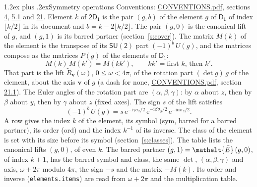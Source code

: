\documentclass[10pt,a4paper]{article}
\makeatletter
\renewcommand\section{\@startsection{section}{1}{\z@}{-3ex plus -1ex minus -.2ex}%
  {1.2ex plus .2ex}{\normalfont\large\sffamily\bfseries\color{parttitle}}}
\numberwithin{equation}{section}
\newcommand{\eltfont}[1]{{\let\sigma\eltsigma\mathelt{#1}}}
\newcommand{\grp}[1]{\mathsf{#1}}
\newcommand{\elt}[1]{\eltfont{#1}}
\newcommand{\vv}{\mathbf{v}}
\newcommand{\iunit}{\mathrm{i}}
\newcommand{\expe}{\mathrm{e}}
\newcommand{\barred}[1]{\bar{#1}}
\newcommand{\lift}[1]{\tilde{#1}}
\newcommand{\pauli}[1]{\sigma_{#1}}
\makeatother
\begin{document}
\section{Symmetry operations}\label{s:elements}
Conventions: \href{../../CONVENTIONS.pdf}{CONVENTIONS.pdf}, sections \href{../../../rotation/CONVENTIONS.pdf\#conv.4}{4}, \href{../../../rotation/CONVENTIONS.pdf\#conv.5.1}{5.1} and \href{../../CONVENTIONS.pdf\#conv.21}{21}.
\leavevmode\label{n:index.element}\label{n:element.g}Element $k$ of $\grp{2D_{1}}$ is the pair $(g, b)$ of the element $g$ of \href{../../../rotation/data/pdf/D1.pdf}{$\grp{D_{1}}$} of index $\lfloor k/2\rfloor$ in its document and $b = k - 2\lfloor k/2\rfloor$. The pair $(g, 0)$ is the canonical lift of $g$, and $(g, 1)$ is its barred partner (section~\ref{s:cover}). \label{n:matrix.element.pin}\label{n:matrix.element}The matrix $M(k)$ of the element is the transpose of its $\grp{SU(2)}$ part $(-1)^{b}\,U(g)$, and the matrices compose as the matrices $P(g)$ of the elements of $\grp{D_{1}}$:
\begin{equation}\label{e:mprod}M(k)\,M(k') = M(kk'),\qquad kk' = \text{first } k\text{, then } k'.\end{equation}
\leavevmode\label{n:angle.omega}\label{n:vector.axis}\label{n:vector.pole}That part is the lift $\lift{R}_{\vv}(\omega)$, $0 \le \omega < 4\pi$, of the rotation part $(\det g)\,g$ of the element, about the axis $\vv$ of $g$ (a dash for none, \href{../../CONVENTIONS.pdf}{CONVENTIONS.pdf}, section \href{../../CONVENTIONS.pdf\#conv.21.1}{21.1}). \label{n:angle.euler.alpha}\label{n:angle.euler.beta}\label{n:angle.euler.gamma}\label{n:vector.coordinates}The Euler angles of the rotation part are $(\alpha,\beta,\gamma)$: by $\alpha$ about $z$, then by $\beta$ about $y$, then by $\gamma$ about $z$ (fixed axes). \label{n:local.euler.sign}The sign $s$ of the lift satisfies
\begin{equation}\label{e:euler}(-1)^{b}\,U(g) = s\,\expe^{-\iunit\gamma\pauli{z}/2}\,\expe^{-\iunit\beta\pauli{y}/2}\,\expe^{-\iunit\alpha\pauli{z}/2}.\end{equation}
\leavevmode\label{n:index.element.inverse}\label{n:head.sym}\label{n:head.ord}A row gives the index $k$ of the element, its symbol (sym, barred for a barred partner), its order (ord) and the index $k^{-1}$ of its inverse. \label{n:head.class}The class of the element is set with its size before its symbol (section~\ref{s:classes}).
The table lists the canonical lifts $(g, 0)$, of even $k$. The barred partner $(g, 1) = \elt{\barred{E}}\,(g, 0)$, of index $k + 1$, has the barred symbol and class, the same $\det$, $(\alpha,\beta,\gamma)$ and axis, $\omega + 2\pi$ modulo $4\pi$, the sign $-s$ and the matrix $-M(k)$. Its order and inverse (\texttt{elements.items}) are read from $\omega + 2\pi$ and the multiplication table.
\end{document}
